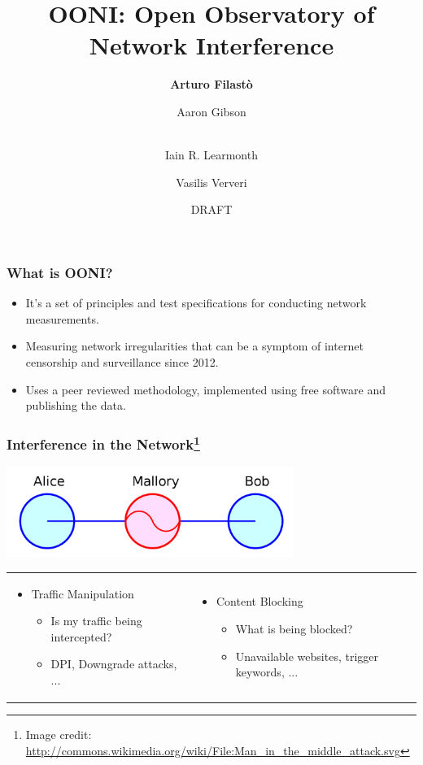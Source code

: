 \documentclass{beamer}
\begin{document}
\title[OONI]{OONI: Open Observatory of Network Interference}
\author[Arturo Filast\`{o}]{{\bf Arturo Filast\`{o}} \and
	{Aaron Gibson} \and \\
	{Iain R. Learmonth} \and
	{Vasilis Ververi}}
\date{DRAFT} 

\begin{frame}
\maketitle
\end{frame}

\begin{frame}
	\frametitle{What is OONI?}
	\begin{itemize}
		\item{It’s a set of principles and test specifications for
			conducting network measurements.}
		\item{Measuring network irregularities that can be a symptom of
			internet censorship and surveillance since 2012.}
		\item{Uses a peer reviewed methodology, implemented using free
			software and publishing the data.}
	\end{itemize}
\end{frame}

\begin{frame}
	\frametitle{Interference in the Network\footnote{\tiny Image credit: \url{http://commons.wikimedia.org/wiki/File:Man_in_the_middle_attack.svg}}}
	\begin{center}
		\includegraphics[width=0.7\textwidth]{mitm.png}
	\end{center}
	\begin{tabular}{ p{} p{} }
	\begin{itemize}
		\item{Traffic Manipulation}
			\begin{itemize}
				\item{Is my traffic being intercepted?}
				\item{DPI, Downgrade attacks, ...}
			\end{itemize}
		\end{itemize} &
		\begin{itemize}
			\item{Content Blocking}
			\begin{itemize}
				\item{What is being blocked?}
				\item{Unavailable websites, trigger keywords, ...}
			\end{itemize}
		\end{itemize}
\end{tabular}
\end{frame}
\end{document}
